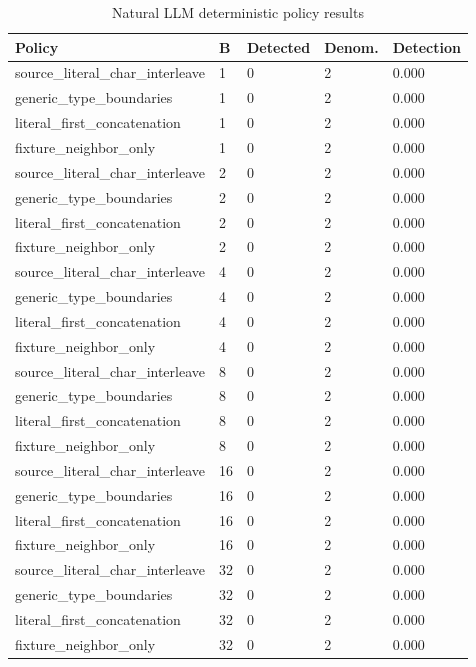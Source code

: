 \begin{table}[t]
\centering
\small
\caption{Natural LLM deterministic policy results}
\begin{tabular}{lllll}
\toprule
Policy & B & Detected & Denom. & Detection \\
\midrule
source\_literal\_char\_interleave & 1 & 0 & 2 & 0.000 \\
generic\_type\_boundaries & 1 & 0 & 2 & 0.000 \\
literal\_first\_concatenation & 1 & 0 & 2 & 0.000 \\
fixture\_neighbor\_only & 1 & 0 & 2 & 0.000 \\
source\_literal\_char\_interleave & 2 & 0 & 2 & 0.000 \\
generic\_type\_boundaries & 2 & 0 & 2 & 0.000 \\
literal\_first\_concatenation & 2 & 0 & 2 & 0.000 \\
fixture\_neighbor\_only & 2 & 0 & 2 & 0.000 \\
source\_literal\_char\_interleave & 4 & 0 & 2 & 0.000 \\
generic\_type\_boundaries & 4 & 0 & 2 & 0.000 \\
literal\_first\_concatenation & 4 & 0 & 2 & 0.000 \\
fixture\_neighbor\_only & 4 & 0 & 2 & 0.000 \\
source\_literal\_char\_interleave & 8 & 0 & 2 & 0.000 \\
generic\_type\_boundaries & 8 & 0 & 2 & 0.000 \\
literal\_first\_concatenation & 8 & 0 & 2 & 0.000 \\
fixture\_neighbor\_only & 8 & 0 & 2 & 0.000 \\
source\_literal\_char\_interleave & 16 & 0 & 2 & 0.000 \\
generic\_type\_boundaries & 16 & 0 & 2 & 0.000 \\
literal\_first\_concatenation & 16 & 0 & 2 & 0.000 \\
fixture\_neighbor\_only & 16 & 0 & 2 & 0.000 \\
source\_literal\_char\_interleave & 32 & 0 & 2 & 0.000 \\
generic\_type\_boundaries & 32 & 0 & 2 & 0.000 \\
literal\_first\_concatenation & 32 & 0 & 2 & 0.000 \\
fixture\_neighbor\_only & 32 & 0 & 2 & 0.000 \\
\bottomrule
\end{tabular}
\end{table}
